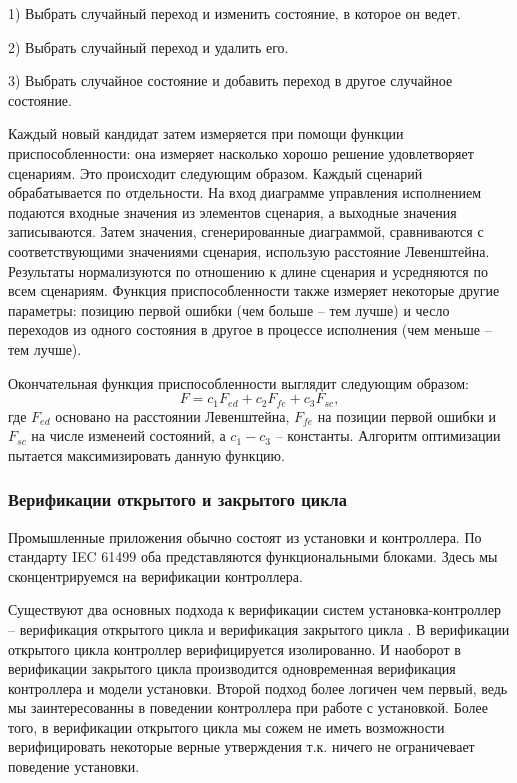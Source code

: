 \documentclass[14pt]{extarticle}
\theoremstyle{plain}
\theoremstyle{definition}
\begin{document}
1) Выбрать случайный переход и изменить состояние, в которое он ведет.

2) Выбрать случайный переход и удалить его.

3) Выбрать случайное состояние и добавить переход в другое случайное состояние.

Каждый новый кандидат затем измеряется при помощи функции приспособленности:
она измеряет насколько хорошо решение удовлетворяет сценариям. Это происходит
следующим образом. Каждый сценарий обрабатывается по отдельности. На вход
диаграмме управления исполнением подаются входные значения из элементов
сценария, а выходные значения записываются. Затем значения, сгенерированные
диаграммой, сравниваются с соответствующими значениями сценария, использую
расстояние Левенштейна. Результаты нормализуются по отношению к длине сценария
и усредняются по всем сценариям. Функция приспособленности также измеряет
некоторые другие параметры: позицию первой ошибки (чем больше -- тем лучше) и
чесло переходов из одного состояния в другое в процессе исполнения (чем меньше
-- тем лучше).

Окончательная функция приспособленности выглядит следующим образом:
$$
F = c_1 F_{ed} + c_2 F_{fe} + c_3 F_{sc},
$$
где $F_{ed}$ основано на расстоянии Левенштейна, $F_{fe}$ на позиции первой
ошибки и $F_{sc}$ на числе изменеий состояний, а $c_1 - c_3$ -- константы.
Алгоритм оптимизации пытается максимизировать данную функцию.

\subsubsection{Верификации открытого и закрытого цикла}

Промышленные приложения обычно состоят из установки и контроллера. По стандарту
IEC 61499 оба представляются функциональными блоками. Здесь мы сконцентрируемся
на верификации контроллера.

Существуют два основных подхода к верификации систем установка-контроллер --
верификация открытого цикла и верификация закрытого цикла \cite{cl}. В верификации
открытого цикла контроллер верифицируется изолированно. И наоборот в
верификации закрытого цикла производится одновременная верификация контроллера
и модели установки. Второй подход более логичен чем первый, ведь мы
заинтересованны в поведении контроллера при работе с установкой. Более того, в
верификации открытого цикла мы сожем не иметь возможности верифицировать
некоторые верные утверждения т.к. ничего не ограничевает поведение установки.
\end{document}
